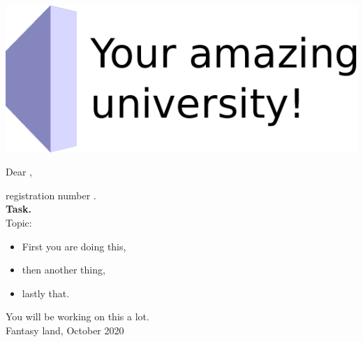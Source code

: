 \begin{center}
\makeatletter
\includegraphics[height=9ex]{./images/logos/university_logo.pdf}

\vspace{1\baselineskip}

Dear \@author{},

registration number \@immnumber{}.\\[0.5\baselineskip]

\textbf{\@thesis{} Task.}\\[0.5\baselineskip]

Topic:

\bfseries\@title

\makeatother
\end{center}
{%
\kant[1-2]
\begin{itemize}
	\item First you are doing this,
	\item then another thing,
	\item lastly that.
\end{itemize}
}%
\vspace{\baselineskip}

\noindent You will be working on this a lot.\\[0.4\baselineskip]

\noindent Fantasy land, October 2020\\[2\baselineskip]